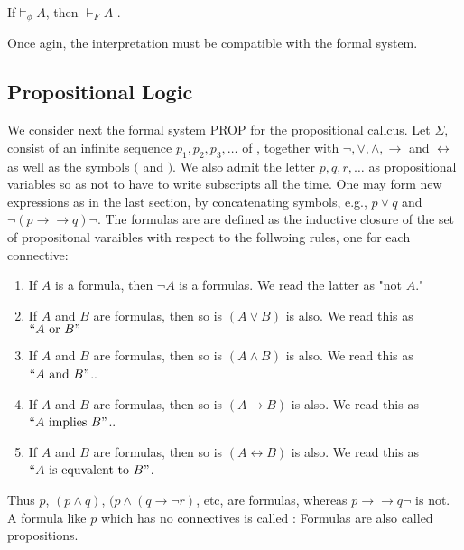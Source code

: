 \begin{indent}
If$\models_\phi A$, then $\vdash_F A$ .
\end{indent}

Once agin, the interpretation must be compatible with the formal system.

\subsection{Propositional Logic}

We consider next the formal system PROP for the propositional callcus.  Let $\Sigma$, consist of an infinite sequence $ p_1, p_2, p_3, \dots$ of , together with   $\neg, \lor, \land, \to$ and $\leftrightarrow$ as well as the symbols $($ and $)$. We also admit the letter $p, q, r, \ldots$ as propositional variables so as not to have to write subscripts all the time.  One may form new expressions as in the last section, by concatenating symbols, e.g., $p \lor q$ and $\neg (p \to\to q) \neg$. The formulas are are defined as the inductive closure of the set of propositonal varaibles with respect to the follwoing rules, one for each connective:

\begin{enumerate}

\item If $A$ is a formula, then $\neg A$ is a formulas.  We read the latter as "not $A$."

\item If $A$ and $B$ are formulas, then so is $(A \lor B)$ is also. We read this as $``A \text{ or } B"$

\item If $A$ and $B$ are formulas, then so is $(A \land B)$ is also. We read this as $``A \text{ and } B"$..

\item If $A$ and $B$ are formulas, then so is $(A \to B)$ is also. We read this as $``A \text{ implies } B"$..

\item If $A$ and $B$ are formulas, then so is $(A \leftrightarrow B)$ is also. We read this as $``A \text{ is equvalent to } B"$.
\end{enumerate}

Thus $p$, $(p \land q)$, $(p \land (q \to \neg r)$, etc, are formulas, whereas $p \to \to q \neg$ is not.  A formula like $p$ which has no connectives is called :  Formulas are also called propositions.

